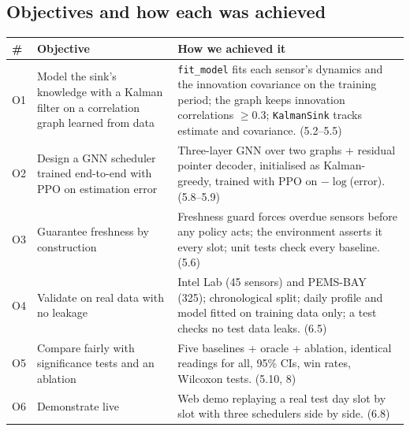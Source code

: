 \subsection{Objectives and how each was achieved}

\begin{center}
\begin{tabularx}{\textwidth}{@{}p{0.6cm}p{5.2cm}X@{}}
\toprule
\textbf{\#} & \textbf{Objective} & \textbf{How we achieved it} \\
\midrule
O1 & Model the sink's knowledge with a Kalman filter on a correlation graph learned from data
   & \texttt{fit\_model} fits each sensor's dynamics and the innovation covariance on the training period;
     the graph keeps innovation correlations $\ge 0.3$; \texttt{KalmanSink} tracks estimate and covariance. (5.2--5.5) \\
O2 & Design a GNN scheduler trained end-to-end with PPO on estimation error
   & Three-layer GNN over two graphs + residual pointer decoder, initialised as Kalman-greedy, trained with PPO
     on $-\log$(error). (5.8--5.9) \\
O3 & Guarantee freshness by construction
   & Freshness guard forces overdue sensors before any policy acts; the environment asserts it every slot;
     unit tests check every baseline. (5.6) \\
O4 & Validate on real data with no leakage
   & Intel Lab (45 sensors) and PEMS-BAY (325); chronological split; daily profile and model fitted on training
     data only; a test checks no test data leaks. (6.5) \\
O5 & Compare fairly with significance tests and an ablation
   & Five baselines + oracle + ablation, identical readings for all, 95\% CIs, win rates, Wilcoxon tests. (5.10, 8) \\
O6 & Demonstrate live
   & Web demo replaying a real test day slot by slot with three schedulers side by side. (6.8) \\
\bottomrule
\end{tabularx}
\end{center}
